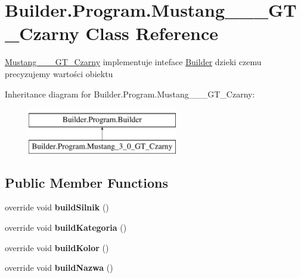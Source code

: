 \hypertarget{class_builder_1_1_program_1_1_mustang__3__0___g_t___czarny}{}\section{Builder.\+Program.\+Mustang\+\_\+\_\+\_\+\+G\+T\+\_\+\+Czarny Class Reference}
\label{class_builder_1_1_program_1_1_mustang__3__0___g_t___czarny}


\hyperlink{class_builder_1_1_program_1_1_mustang__3__0___g_t___czarny}{Mustang\+\_\+\_\+\_\+\+G\+T\+\_\+\+Czarny} implementuje inteface \hyperlink{class_builder_1_1_program_1_1_builder}{Builder} dzieki czemu precyzujemy wartości obiektu  


Inheritance diagram for Builder.\+Program.\+Mustang\+\_\+\_\+\_\+\+G\+T\+\_\+\+Czarny\+:\begin{figure}[H]
\begin{center}
\leavevmode
\includegraphics[height=2.000000cm]{class_builder_1_1_program_1_1_mustang__3__0___g_t___czarny}
\end{center}
\end{figure}
\subsection*{Public Member Functions}
\begin{DoxyCompactItemize}
\item 
\mbox{\label{class_builder_1_1_program_1_1_mustang__3__0___g_t___czarny_a1d0fb9488ef4802206af0c2378115d7a}} 
override void {\bfseries build\+Silnik} ()
\item 
\mbox{\label{class_builder_1_1_program_1_1_mustang__3__0___g_t___czarny_adc30373d97de4d016604b9b93a9c55c1}} 
override void {\bfseries build\+Kategoria} ()
\item 
\mbox{\label{class_builder_1_1_program_1_1_mustang__3__0___g_t___czarny_a1c82fa76d55453780b905baa74ad06d6}} 
override void {\bfseries build\+Kolor} ()
\item 
\mbox{\label{class_builder_1_1_program_1_1_mustang__3__0___g_t___czarny_aae607f4545c14fd451690bb7c6f3309f}} 
override void {\bfseries build\+Nazwa} ()
\end{DoxyCompactItemize}
